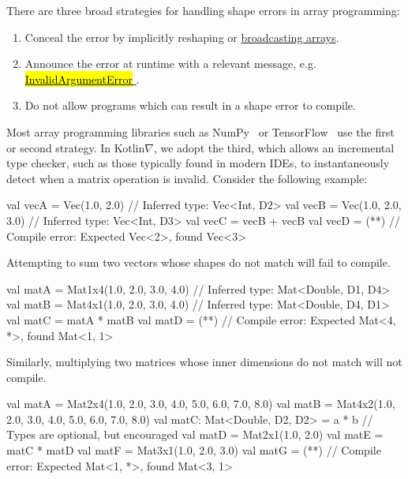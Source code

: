 \documentclass[12pt,initial,twoside,maitrise]{dms}
\makeatletter
\def\uwave{\bgroup \markoverwith{\lower3.5\p@\hbox{\sixly \textcolor{red}{\char58}}}\ULon}
\newcommand{\inline}[1]{%
    \begingroup%
    \sethlcolor{slightgray}%
    \hl{\ttfamily\small #1}%
    \endgroup
}
\numberwithin{equation}{section}
\numberwithin{table}{chapter}
\numberwithin{figure}{chapter}
\makeatother
\begin{document}
\noindent There are three broad strategies for handling shape errors in array programming: \\
%
\begin{enumerate}
    \item Conceal the error by implicitly reshaping or \href{https://docs.scipy.org/doc/numpy-1.15.0/user/basics.broadcasting.html}{broadcasting arrays}.
    \item Announce the error at runtime with a relevant message, e.g.~\href{https://www.tensorflow.org/api_docs/python/tf/errors/InvalidArgumentError}{\inline{InvalidArgumentError}}.
    \item Do not allow programs which can result in a shape error to compile. \\
\end{enumerate}
%
Most array programming libraries such as NumPy~\citep{van2011numpy} or TensorFlow~\citep{abadi2016tensorflow} use the first or second strategy. In Kotlin$\nabla$, we adopt the third, which allows an incremental type checker, such as those typically found in modern IDEs, to instantaneously detect when a matrix operation is invalid. Consider the following example:
%
\begin{kotlinlisting}
val vecA = Vec(1.0, 2.0)      // Inferred type: Vec<Int, D2>
val vecB = Vec(1.0, 2.0, 3.0) // Inferred type: Vec<Int, D3>
val vecC = vecB + vecB
val vecD = (*\uwave{vecA + vecB}*) // Compile error: Expected Vec<2>, found Vec<3>
\end{kotlinlisting}
%
Attempting to sum two vectors whose shapes do not match will fail to compile.
%
\begin{kotlinlisting}
val matA = Mat1x4(1.0, 2.0, 3.0, 4.0) // Inferred type: Mat<Double, D1, D4>
val matB = Mat4x1(1.0, 2.0, 3.0, 4.0) // Inferred type: Mat<Double, D4, D1>
val matC = matA * matB
val matD = (*\uwave{matA *\ matC}*) // Compile error: Expected Mat<4, *>, found Mat<1, 1>
\end{kotlinlisting}
%
Similarly, multiplying two matrices whose inner dimensions do not match will not compile.
%
\begin{kotlinlisting}
val matA = Mat2x4(1.0, 2.0, 3.0, 4.0,
                  5.0, 6.0, 7.0, 8.0)
val matB = Mat4x2(1.0, 2.0,
                  3.0, 4.0,
                  5.0, 6.0,
                  7.0, 8.0)
val matC: Mat<Double, D2, D2> = a * b // Types are optional, but encouraged
val matD = Mat2x1(1.0, 2.0)
val matE = matC * matD
val matF = Mat3x1(1.0, 2.0, 3.0)
val matG = (*\uwave{matE *\ matF}*) // Compile error: Expected Mat<1, *>, found Mat<3, 1>
\end{kotlinlisting}
\end{document}

